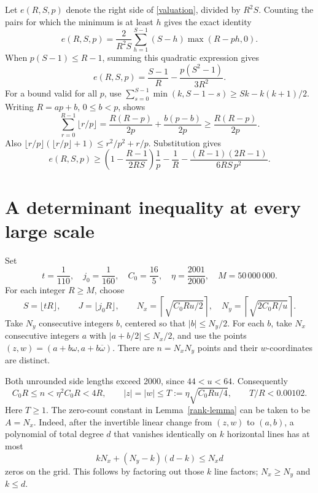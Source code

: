 \documentclass[11pt]{article}
\begin{document}
Let \(e(R,S,p)\) denote the right side of \eqref{valuation}, divided
by \(R^2S\). Counting the pairs for which the minimum is at least
\(h\) gives the exact identity
\begin{equation}\label{layers}
 e(R,S,p)=\frac2{R^2S}
 \sum_{h=1}^{S-1}(S-h)\max(R-ph,0).
\end{equation}
When \(p(S-1)\le R-1\), summing this quadratic expression gives
\begin{equation}\label{small-e}
 e(R,S,p)=\frac{S-1}{R}-\frac{p(S^2-1)}{3R^2}.
\end{equation}
For a bound valid for all \(p\), use
\(\sum_{s=0}^{S-1}\min(k,S-1-s)\ge Sk-k(k+1)/2\).
Writing \(R=ap+b\), \(0\le b<p\), shows
\[
 \sum_{r=0}^{R-1}\lfloor r/p\rfloor
 =\frac{R(R-p)}{2p}+\frac{b(p-b)}{2p}
 \ge\frac{R(R-p)}{2p}.
\]
Also \(\lfloor r/p\rfloor(\lfloor r/p\rfloor+1)
\le r^2/p^2+r/p\). Substitution gives
\begin{equation}\label{tail-e}
 e(R,S,p)\ge
 \left(1-\frac{R-1}{2RS}\right)\frac1p
 -\frac1R-\frac{(R-1)(2R-1)}{6RS\,p^2}.
\end{equation}

\section{A determinant inequality at every large scale}\label{scales}

Set
\[
 t=\frac1{110},\quad j_0=\frac1{160},\quad
 C_0=\frac{16}{5},\quad \eta=\frac{2001}{2000},\quad
 M=50\,000\,000.
\]
For each integer \(R\ge M\), choose
\[
 S=\lfloor tR\rfloor,\qquad J=\lfloor j_0R\rfloor,\qquad
 N_x=\left\lceil\sqrt{C_0Ru/2}\right\rceil,\quad
 N_y=\left\lceil\sqrt{2C_0R/u}\right\rceil.
\]
Take \(N_y\) consecutive integers \(b\), centered so that
\(|b|\le N_y/2\). For each \(b\), take \(N_x\) consecutive integers
\(a\) with \(|a+b/2|\le N_x/2\), and use the points
\((z,w)=(a+b\omega,a+b\overline\omega)\).
There are \(n=N_xN_y\) points and their \(w\)-coordinates are distinct.

Both unrounded side lengths exceed 2000, since \(44<u<64\).
Consequently
\[
 C_0R\le n<\eta^2C_0R<4R,\qquad
 |z|=|w|\le T:=\eta\sqrt{C_0Ru/4},\qquad T/R<0.00102.
\]
Here \(T\ge1\). The zero-count constant in
Lemma~\ref{rank-lemma} can be taken to be \(A=N_x\).
Indeed, after the invertible linear change from \((z,w)\) to \((a,b)\),
a polynomial of total degree \(d\) that vanishes identically on \(k\)
horizontal lines has at most
\[
 kN_x+(N_y-k)(d-k)\le N_xd
\]
zeros on the grid. This follows by factoring out those \(k\) line
factors; \(N_x\ge N_y\) and \(k\le d\).
\end{document}
